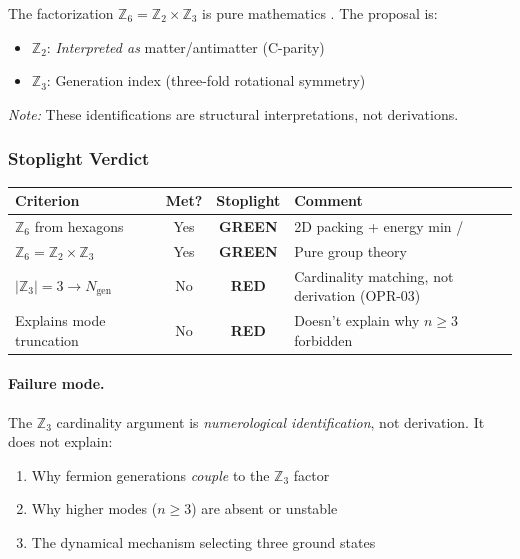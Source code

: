 The factorization $\mathbb{Z}_6 = \mathbb{Z}_2 \times \mathbb{Z}_3$ is pure
mathematics \tagM{}. The proposal is:
\begin{itemize}[nosep]
    \item $\mathbb{Z}_2$: \emph{Interpreted as} matter/antimatter (C-parity) \tagP{}
    \item $\mathbb{Z}_3$: Generation index (three-fold rotational symmetry) \tagP{}
\end{itemize}
\emph{Note:} These identifications are structural interpretations, not derivations.

\subsubsection{Stoplight Verdict}

\begin{center}
\small
\begin{tabular}{p{3cm}ccp{5cm}}
\toprule
\textbf{Criterion} & \textbf{Met?} & \textbf{Stoplight} & \textbf{Comment} \\
\midrule
$\mathbb{Z}_6$ from hexagons & Yes & \textcolor{green!50!black}{\textbf{GREEN}} & 2D packing + energy min \tagDc{}/\tagP{} \\
$\mathbb{Z}_6 = \mathbb{Z}_2 \times \mathbb{Z}_3$ & Yes & \textcolor{green!50!black}{\textbf{GREEN}} & Pure group theory \tagM{} \\
$|\mathbb{Z}_3| = 3 \to N_{\text{gen}}$ & No & \textcolor{red!80!black}{\textbf{RED}} & Cardinality matching, not derivation (OPR-03) \\
Explains mode truncation & No & \textcolor{red!80!black}{\textbf{RED}} & Doesn't explain why $n \geq 3$ forbidden \\
\bottomrule
\end{tabular}
\end{center}

\paragraph{Failure mode.}
The $\mathbb{Z}_3$ cardinality argument is \emph{numerological identification},
not derivation. It does not explain:
\begin{enumerate}[nosep]
    \item Why fermion generations \emph{couple} to the $\mathbb{Z}_3$ factor
    \item Why higher modes ($n \geq 3$) are absent or unstable
    \item The dynamical mechanism selecting three ground states
\end{enumerate}

